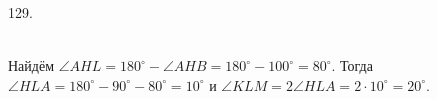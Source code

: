 129. \begin{figure}[ht!]
\end{figure}\\
Найдём $\angle AHL=180^\circ-\angle AHB=180^\circ-100^\circ=80^\circ.$ Тогда $\angle HLA=180^\circ-90^\circ-80^\circ=10^\circ$ и $\angle KLM=2\angle HLA=2\cdot10^\circ=20^\circ.$\\
